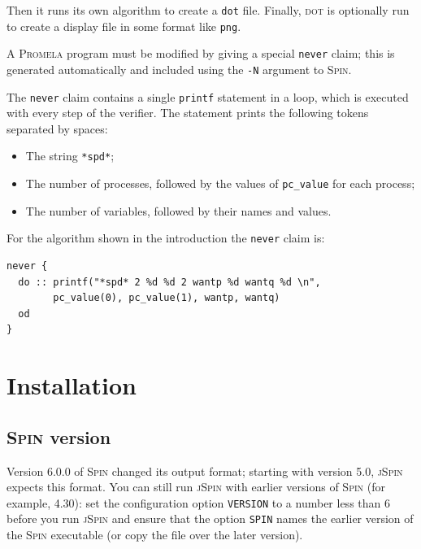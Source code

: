 \documentclass[11pt]{article}
\newcommand{\spn}{\textsc{Spin}}
\newcommand{\prm}{\textsc{Promela}}
\newcommand{\js}{\textsc{jSpin}}
\newcommand{\dt}{\textsc{dot}}
\newcommand{\dtf}{\texttt{dot}}
\newcommand{\p}[1]{\texttt{#1}}
\begin{document}
Then it runs its own algorithm to create a \dtf{} file. Finally, \dt{} is 
optionally run to create a display file in some format like \p{png}.

A \prm{} program must be modified by giving a special \p{never} claim; this is
generated automatically and included using the \p{-N} argument to \spn{}. 

The \p{never} claim contains a single \p{printf} statement in a loop, which is 
executed with every step of the verifier. The statement prints the 
following tokens separated by spaces:
\begin{itemize}
\item The string \p{*spd*};
\item The number of processes, followed by the values of \p{pc\_value}
for each process;
\item The number of variables, followed by their names and values.
\end{itemize}
For the algorithm shown in the introduction the \p{never} claim is:
\begin{verbatim}
never {
  do :: printf("*spd* 2 %d %d 2 wantp %d wantq %d \n",
        pc_value(0), pc_value(1), wantp, wantq)
  od
}
\end{verbatim}

\newpage

\appendix

\section{Installation}\label{a.install}

\subsection{\spn{} version}

Version 6.0.0 of \spn{} changed its output format; starting with version
5.0, \js{} expects this format. You can still run \js{} with earlier
versions of \spn{} (for example, 4.30): set the configuration option
\p{VERSION} to a number less than 6 before you run \js{} and ensure that
the option \p{SPIN} names the earlier version of the \spn{} executable
(or copy the file over the later version).
\end{document}
